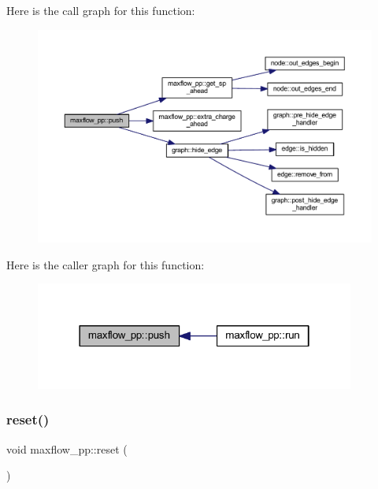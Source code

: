 Here is the call graph for this function\+:\nopagebreak
\begin{figure}[H]
\begin{center}
\leavevmode
\includegraphics[width=350pt]{classmaxflow__pp_ae7c9ce8d1cad511d70022e2f62567590_cgraph}
\end{center}
\end{figure}
Here is the caller graph for this function\+:\nopagebreak
\begin{figure}[H]
\begin{center}
\leavevmode
\includegraphics[width=298pt]{classmaxflow__pp_ae7c9ce8d1cad511d70022e2f62567590_icgraph}
\end{center}
\end{figure}
\mbox{\label{classmaxflow__pp_a2179764baf624f1414211f3a7181b1a0}} 
\subsubsection{\texorpdfstring{reset()}{reset()}}
{\footnotesize\ttfamily void maxflow\+\_\+pp\+::reset (\begin{DoxyParamCaption}{ }\end{DoxyParamCaption})\hspace{0.3cm}{\ttfamily [virtual]}}


